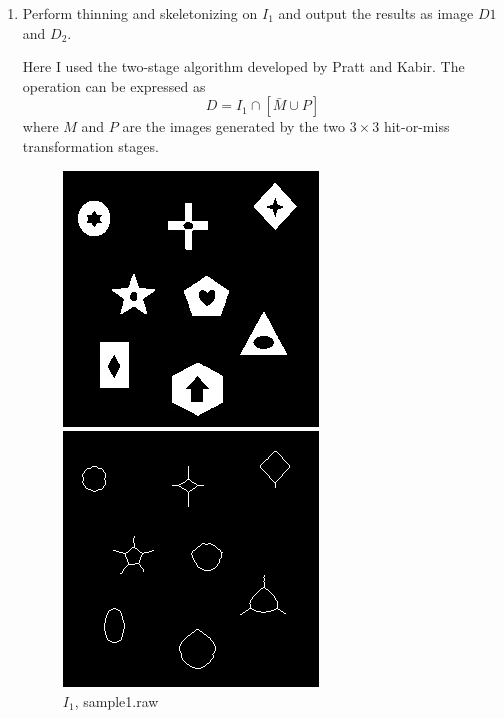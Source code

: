 \documentclass[12pt,a4paper,notitlepage,oneside,amsmath,amssymb]{article}
\begin{document}
\begin{CJK*}{UTF8}{bkai}
\begin{enumerate}[label=(\alph*)]
	\item Perform thinning and skeletonizing on \(I_1\) and output the results as image \(D1\) and \(D_2\).


	      Here I used the two-stage algorithm developed by Pratt and Kabir. The operation can be expressed as
	      \[D = I_1 \cap [\bar{M} \cup P]\]
	      where \(M\) and \(P\) are the images generated by the two \(3\times3\) hit-or-miss transformation stages.

	      \begin{figure}[hbt!]
		      \centering
		      \begin{minipage}{.3\textwidth}
			      \centering
			      \includegraphics[width=.9\linewidth]{sample1}
			      \caption*{\(I_1\), sample1.raw}
		      \end{minipage}%
		      \begin{minipage}{.3\textwidth}
			      \centering
			      \includegraphics[width=.9\linewidth]{image_D1}

\end{minipage}
\end{figure}
\end{enumerate}
\end{CJK*}
\end{document}
